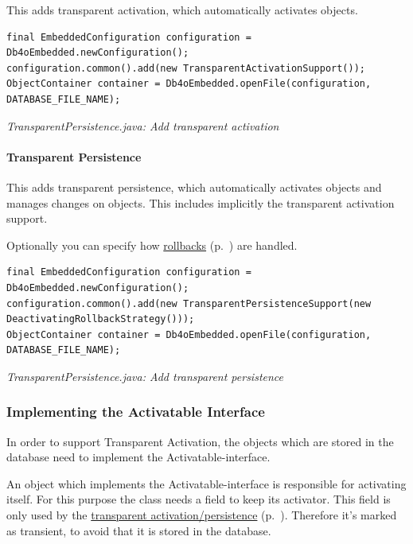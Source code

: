 This adds transparent activation, which automatically activates objects.

\begin{lstlisting}
final EmbeddedConfiguration configuration = Db4oEmbedded.newConfiguration();
configuration.common().add(new TransparentActivationSupport());
ObjectContainer container = Db4oEmbedded.openFile(configuration, DATABASE_FILE_NAME);
\end{lstlisting}

{\small\itshape TransparentPersistence.java: Add transparent activation\par}
\medskip

\paragraph*{Transparent Persistence}

This adds transparent persistence, which automatically activates objects and manages changes on objects. This includes implicitly the transparent activation support.

Optionally you can specify how \hyperref[ref:basics-transparentpersistence-automatic-deactivation]{rollbacks} (p.~\pageref{ref:basics-transparentpersistence-automatic-deactivation}) are handled.

\begin{lstlisting}
final EmbeddedConfiguration configuration = Db4oEmbedded.newConfiguration();
configuration.common().add(new TransparentPersistenceSupport(new DeactivatingRollbackStrategy()));
ObjectContainer container = Db4oEmbedded.openFile(configuration, DATABASE_FILE_NAME);
\end{lstlisting}

{\small\itshape TransparentPersistence.java: Add transparent persistence\par}
\medskip

\subsubsection{Implementing the Activatable Interface}
\label{ref:basics-transparentpersistence-implementation:implemen}

In order to support Transparent Activation, the objects which are stored in the database need to implement the Activatable-interface.

An object which implements the Activatable-interface is responsible for activating itself. For this purpose the class needs a field to keep its activator. This field is only used by the \hyperref[ref:basics-transparent-persistence]{transparent activation/persistence} (p.~\pageref{ref:basics-transparent-persistence}). Therefore it's marked as transient, to avoid that it is stored in the database.


